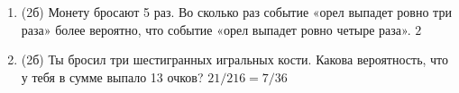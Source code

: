\documentclass[a4paper, 12pt]{article}
\begin{document}
\begin{enumerate}
\item (2б) Монету бросают 5 раз. Во сколько раз событие «орел выпадет ровно три раза» более вероятно, что событие «орел выпадет ровно четыре раза». $2$
\item (2б) Ты бросил три шестигранных игральных кости. Какова вероятность, что у тебя в сумме выпало 13 очков? $21/216=7/36$




\end{enumerate}
\end{document}
